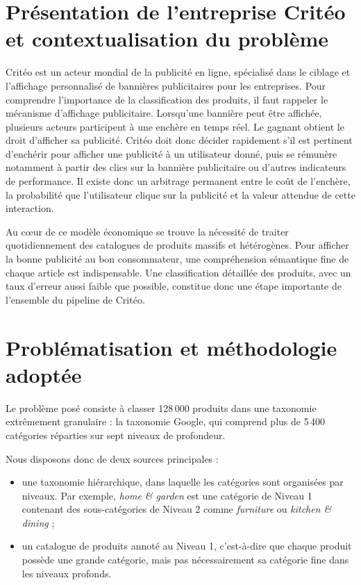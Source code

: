 \documentclass[12pt,a4paper]{report}
\begin{document}
\section{Présentation de l'entreprise Critéo et contextualisation du problème}

Critéo est un acteur mondial de la publicité en ligne, spécialisé dans le ciblage et l'affichage personnalisé de bannières publicitaires pour les entreprises.
Pour comprendre l'importance de la classification des produits, il faut rappeler le mécanisme d'affichage publicitaire. Lorsqu'une bannière peut être affichée, plusieurs acteurs participent à une enchère en temps réel. 
Le gagnant obtient le droit d'afficher sa publicité. Critéo doit donc décider rapidement s'il est pertinent d'enchérir pour afficher une publicité à un utilisateur donné, puis se rémunère notamment à partir des clics sur la bannière publicitaire ou d'autres indicateurs de performance.
Il existe donc un arbitrage permanent entre le coût de l'enchère, la probabilité que l'utilisateur clique sur la publicité et la valeur attendue de cette interaction.

Au cœur de ce modèle économique se trouve la nécessité de traiter quotidiennement des catalogues de produits massifs et hétérogènes. Pour afficher la bonne publicité au bon consommateur, une compréhension sémantique fine de chaque article est indispensable. Une classification détaillée des produits, avec un taux d'erreur aussi faible que possible, constitue donc une étape importante de l'ensemble du pipeline de Critéo.

\section{Problématisation et méthodologie adoptée}

Le problème posé consiste à classer 128\,000 produits dans une taxonomie extrêmement granulaire : la taxonomie Google, qui comprend plus de 5\,400 catégories réparties sur sept niveaux de profondeur.


Nous disposons donc de deux sources principales :
\begin{itemize}[leftmargin=1.2cm]
    \item une taxonomie hiérarchique, dans laquelle les catégories sont organisées par niveaux. Par exemple, \textit{home \& garden} est une catégorie de Niveau 1 contenant des sous-catégories de Niveau 2 comme \textit{furniture} ou \textit{kitchen \& dining} ;
    \item un catalogue de produits annoté au Niveau 1, c'est-à-dire que chaque produit possède une grande catégorie, mais pas nécessairement sa catégorie fine dans les niveaux profonds.
\end{itemize}
\end{document}
